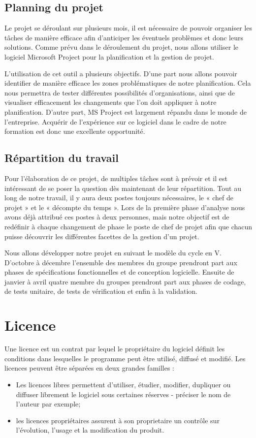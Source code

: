\subsection{Planning du projet}
	Le projet se déroulant sur plusieurs mois, il est nécessaire de pouvoir organiser les tâches de manière efficace afin d’anticiper les éventuels problèmes et donc leurs solutions. Comme prévu dans le déroulement du projet, nous allons utiliser le logiciel Microsoft Project pour la planification et la gestion de projet.

	L’utilisation de cet outil a plusieurs objectifs. D’une part nous allons pouvoir identifier de manière efficace les zones problématiques de notre planification. Cela nous permettra de tester différentes possibilités d’organisations, ainsi que de visualiser efficacement les changements que l’on doit appliquer à notre planification. D’autre part, MS Project est largement répandu dans le monde de l’entreprise.  Acquérir de l’expérience sur ce logiciel dans le cadre de notre formation est donc une excellente opportunité.


\subsection{Répartition du travail}
	Pour l’élaboration de ce projet, de multiples tâches sont à prévoir et il est intéressant de se poser la question dès maintenant de leur répartition. Tout au long de notre travail, il y aura deux postes toujours nécessaires, le « chef de projet » et le « décompte du temps ». Lors de la première phase d’analyse nous avons déjà attribué ces postes à deux personnes, mais notre objectif est de redéfinir à chaque changement de phase le poste de chef de projet afin que chacun puisse découvrir les différentes facettes de la gestion d’un projet.  

	Nous allons développer notre projet en suivant le modèle du cycle en V. D'octobre à décembre l'ensemble des membres du groupe prendront part aux phases de spécifications fonctionnelles et de conception logicielle. Ensuite de janvier à avril quatre membre du groupes prendront part aux phases de codage, de tests unitaire, de tests de vérification et enfin à la validation.


\section{Licence}

	Une licence est un contrat par lequel le propriétaire du logiciel définit les conditions dans lesquelles le programme peut être utilisé, diffusé et modifié. Les licences peuvent être séparées en deux grandes familles :
	\begin{itemize}
		\item Les licences libres permettent d’utiliser, étudier, modifier, dupliquer ou diffuser librement le logiciel sous certaines réserves - préciser le nom de l'auteur par exemple;
		\item les licences propriétaires assurent à son proprietaire un contrôle sur l’évolution, l’usage et la modification du produit.
	\end{itemize}

